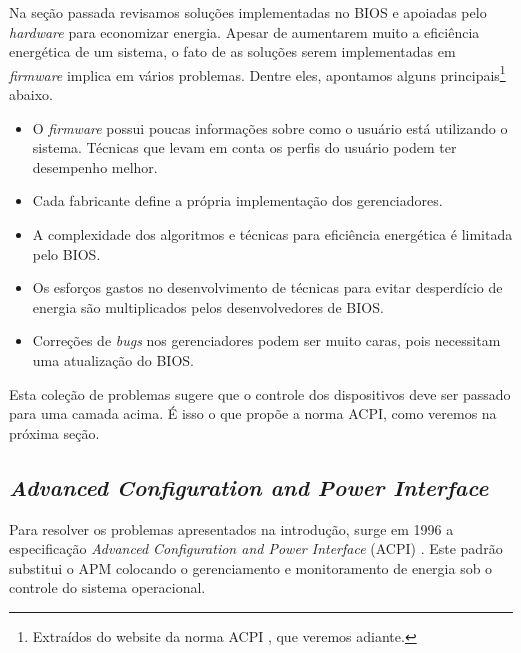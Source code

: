 Na seção passada revisamos soluções implementadas no BIOS e apoiadas pelo \emph{hardware} para economizar energia. Apesar de aumentarem muito a eficiência energética de um sistema, o fato de as soluções serem implementadas em \emph{firmware} implica em vários problemas. Dentre eles, apontamos alguns principais\footnote{Extraídos do website da norma ACPI \cite{ACPI_Overview:Online}, que veremos adiante.} abaixo.

\begin{itemize}

\item O \emph{firmware} possui poucas informações sobre como o usuário está utilizando o sistema. Técnicas que levam em conta os perfis do usuário podem ter desempenho melhor.

\item Cada fabricante define a própria implementação dos gerenciadores.


\item A complexidade dos algoritmos e técnicas para eficiência energética é limitada pelo BIOS.

\item Os esforços gastos no desenvolvimento de técnicas para evitar desperdício de energia são multiplicados pelos desenvolvedores de BIOS.

\item Correções de \emph{bugs} nos gerenciadores podem ser muito caras, pois necessitam uma atualização do BIOS.

\end{itemize}

Esta coleção de problemas sugere que o controle dos dispositivos deve ser passado para uma camada acima. É isso o que propõe a norma ACPI, como veremos na próxima seção.

\subsection{\emph{Advanced Configuration and Power Interface}}

Para resolver os problemas apresentados na introdução, surge em 1996 a especificação \emph{Advanced Configuration and Power Interface} (ACPI) \cite{hewlett2004microsoft}. Este padrão substitui o APM colocando o gerenciamento e monitoramento de energia sob o controle do sistema operacional.

